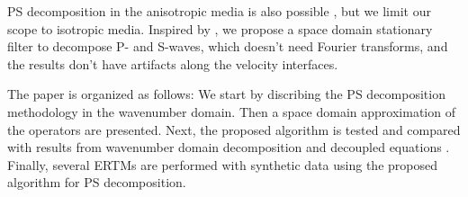 \documentclass[manuscript,ulem,graphix,revised]{geophysics}
\begin{document}

PS decomposition in the anisotropic media is also possible \citep{zhang10, cheng14, wenlong18}, but we limit our scope to isotropic media. Inspired by \citet{yan09}, we propose a space domain stationary filter to decompose P- and S-waves, which doesn't need Fourier transforms, and the results don't have artifacts along the velocity interfaces.

The paper is organized as follows: We start by discribing the PS decomposition methodology in the wavenumber domain. Then a space domain approximation of the operators are presented. Next, the proposed algorithm is tested and compared with results from wavenumber domain decomposition \citep{zhang10} and decoupled equations \citep{ma03, wenlong_cmp15}. Finally, several ERTMs are performed with synthetic data using the proposed algorithm for PS decomposition.
\end{document}
